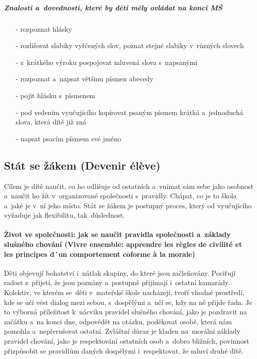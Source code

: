 					\subparagraph{Znalosti a~dovednosti, které by děti měly ovládat na konci MŠ}
					\begin{itemize}
						\setlength\itemsep{-2mm}
						\item[-] rozpoznat hlásky
						\item[-] rozlišovat slabiky vyřčených slov, poznat stejné slabiky v různých slovech
						\item[-] z krátkého výroku pospojovat mluvená slova s napsanými
						\item[-] rozpoznat a~napsat většinu písmen abecedy
						\item[-] pojit hlásku s písmenem
						\item[-] pod vedením vyučujícího kopírovat psaným písmem krátká a~jednoduchá slova, která dítě již zná
						\item[-] napsat psacím písmem své jméno
					\end{itemize}


		\subsection{Stát se žákem (Devenir élève)}
			Cílem je dítě naučit, co ho odlišuje od ostatních a~vnímat sám sebe jako osobnost a~naučit ho žít v organizované společnosti s pravidly. Chápat, co je to škola a~jaké je v ní jeho místo. Stát se žákem je postupný proces, který od vyučujícího vyžaduje jak flexibilitu, tak důslednost.
			\paragraph{Život ve společnosti: jak se naučit pravidla společnosti a~základy slušného chování (Vivre ensemble: apprendre les règles de civilité et les principes d´un comportement coforme à la morale)}
				Děti objevují bohatství i~nátlak skupiny, do které jsou začleňovány. Pociťují radost z přijetí, že jsou poznány a~postupně přijímají i~ostatní kamarády. Kolektiv, ve kterém se děti v mateřské škole nacházejí, tvoří vhodné prostředí, kde se učí vést dialog mezi sebou, s dospělými a~učí se, kdy na ně přijde řada. Je to výborná příležitost k nácviku pravidel slušného chování, jako je pozdravit na začátku a~na konci dne, odpovědět na otázku, poděkovat osobě, která nám pomohla a~nepřerušovat ostatní. Zvláštní důraz je kladen na morální základy pravidel chování, jako je respektování ostatních osob a~dobro bližních, povinnost přizpůsobit se pravidlům daných dospělými i~respektovat, že mluví druhé dítě. 

